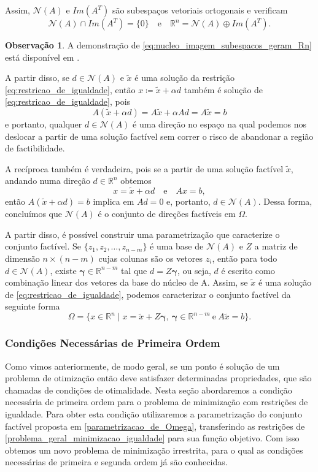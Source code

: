 \documentclass[12pt,a4paper]{scrartcl}
\def\RR{\mathds{R}}
\theoremstyle{definition}%
\newtheorem{obs}{Observação}
\begin{document}
Assim, $\mathcal{N}(A)$ e $Im(A^{T})$ são subespaços vetoriais ortogonais e verificam
\[ \label{eq:nucleo_imagem_subespacos_geram_Rn} \mathcal{N}(A) \cap Im(A^{T}) = \{ 0 \} \quad \text{e} \quad \RR^{n} = \mathcal{N}(A) \oplus Im(A^{T}) .\]
\begin{obs} 
A demonstração de \eqref{eq:nucleo_imagem_subespacos_geram_Rn} está disponível em \textcite{Elon2014}.
\end{obs}

A partir disso, se $d \in \mathcal{N}(A)$ e $\tilde{x}$ é uma solução da restrição \eqref{eq:restricao_de_igualdade}, então $x\coloneqq  \tilde{x} + \alpha d$ também é solução de \eqref{eq:restricao_de_igualdade}, pois
\[
A(\tilde{x} + \alpha d) = A\tilde{x}
 + \alpha Ad = A\tilde{x} = b
\]
 e portanto, qualquer $d \in \mathcal{N}(A)$ é uma direção no espaço na qual podemos nos deslocar a partir de uma solução factível sem correr o risco de abandonar a região de factibilidade. 

A recíproca também é verdadeira, pois se a partir de uma solução factível $\tilde{x}$, andando numa direção $d \in \RR^{n}$ obtemos
\[
x=\tilde{x} + \alpha d \quad \text{e} \quad Ax=b ,
\]
então $A(\tilde{x} + \alpha d) = b$ implica em $Ad = 0$ e, portanto, $d \in \mathcal{N}(A)$. Dessa forma, concluímos que $\mathcal{N}(A)$ é o conjunto de direções factíveis em $\Omega$.

A partir disso, é possível construir uma parametrização que caracterize o conjunto factível. Se $\{ z_{1}, z_{2}, \ldots , z_{n-m} \}$ é uma base de $\mathcal{N}(A)$ e $Z$ a matriz de dimensão $n\times (n-m)$ cujas colunas são os vetores $z_{i}$, então para todo $d \in \mathcal{N}(A)$, existe $\boldsymbol{\gamma} \in \RR^{n-m}$ tal que $d=Z\boldsymbol{\gamma}$, ou seja, $d$ é escrito como combinação linear dos vetores da base do núcleo de A. Assim, se $\tilde{x}$ é uma solução de \eqref{eq:restricao_de_igualdade}, podemos caracterizar o conjunto factível da seguinte forma
\[ \label{parametrizacao_de_Omega}
\Omega = \{ x \in \RR^{n} \mid x=\tilde{x} + Z\boldsymbol{\gamma} , \ \boldsymbol{\gamma} \in \RR^{n-m} \ \text{e} \ A\tilde{x} =b \} .
\]

\subsubsection{Condições Necessárias de Primeira Ordem} \label{subsection:condicoes_1ordem_igualdade}

Como vimos anteriormente, de modo geral, se um ponto é solução de um problema de otimização então deve satisfazer determinadas propriedades, que são chamadas de condições de otimalidade. Nesta seção abordaremos a condição necessária de primeira ordem para o problema de minimização com restrições de igualdade. Para obter esta condição utilizaremos a parametrização do conjunto factível proposta em \eqref{parametrizacao_de_Omega}, transferindo as restrições de \eqref{problema_geral_minimizacao_igualdade} para sua função objetivo. Com isso obtemos um novo problema de minimização irrestrita, para o qual as condições necessárias de primeira e segunda ordem já são conhecidas.
\end{document}
